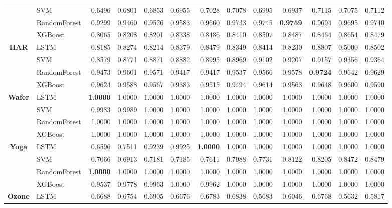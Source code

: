 \begin{table}[h]
\begin{adjustbox}{max width=15cm}
\begin{tabular}{|c|l|r|r|r|r|r|r|r|r|r|r|r|}
		& SVM &  0.6496 &  0.6801 &  0.6853 &  0.6955 &  0.7028 &  0.7078 &  0.6995 &  0.6937 &  0.7115 &  0.7075 &  0.7112 \\
		& RandomForest &  0.9299 &  0.9460 &  0.9526 &  0.9583 &  0.9660 &  0.9733 &  0.9745 &  \textbf{0.9759} &  0.9694 &  0.9695 &  0.9740 \\
		& XGBoost &  0.8065 &  0.8208 &  0.8201 &  0.8338 &  0.8486 &  0.8410 &  0.8507 &  0.8487 &  0.8464 &  0.8654 &  0.8479 \\
		\hline
		\textbf{HAR} & LSTM &  0.8185 &  0.8274 &  0.8214 &  0.8379 &  0.8479 &  0.8349 &  0.8414 &  0.8230 &  0.8807 &  0.5000 &  0.8502 \\
		& SVM &  0.8579 &  0.8771 &  0.8871 &  0.8882 &  0.8995 &  0.8969 &  0.9102 &  0.9207 &  0.9157 &  0.9356 &  0.9364 \\
		& RandomForest &  0.9473 &  0.9601 &  0.9571 &  0.9417 &  0.9417 &  0.9537 &  0.9566 &  0.9578 &  \textbf{0.9724} &  0.9642 &  0.9629 \\
		& XGBoost &  0.9624 &  0.9588 &  0.9567 &  0.9383 &  0.9515 &  0.9494 &  0.9614 &  0.9563 &  0.9648 &  0.9600 &  0.9590 \\
		\hline
		\textbf{Wafer} & LSTM &  \textbf{1.0000} &  1.0000 &  1.0000 &  1.0000 &  1.0000 &  1.0000 &  1.0000 &  1.0000 &  1.0000 &  1.0000 &  1.0000 \\
		& SVM &  0.9983 &  0.9989 &  1.0000 &  1.0000 &  1.0000 &  1.0000 &  1.0000 &  1.0000 &  1.0000 &  1.0000 &  1.0000 \\
		& RandomForest &  1.0000 &  1.0000 &  1.0000 &  1.0000 &  1.0000 &  1.0000 &  1.0000 &  1.0000 &  1.0000 &  1.0000 &  1.0000 \\
		& XGBoost &  1.0000 &  1.0000 &  1.0000 &  1.0000 &  1.0000 &  1.0000 &  1.0000 &  1.0000 &  1.0000 &  1.0000 &  1.0000 \\
		\hline
		\textbf{Yoga} & LSTM &  0.6596 &  0.7511 &  0.9239 &  0.9925 &  \textbf{1.0000} &  1.0000 &  1.0000 &  1.0000 &  1.0000 &  1.0000 &  1.0000 \\
		& SVM &  0.7066 &  0.6913 &  0.7181 &  0.7185 &  0.7611 &  0.7988 &  0.7731 &  0.8122 &  0.8205 &  0.8472 &  0.8479 \\
		& RandomForest &  \textbf{1.0000} &  1.0000 &  1.0000 &  1.0000 &  1.0000 &  1.0000 &  1.0000 &  1.0000 &  1.0000 &  1.0000 &  1.0000 \\
		& XGBoost &  0.9537 &  0.9778 &  0.9963 &  1.0000 &  0.9962 &  1.0000 &  1.0000 &  1.0000 &  1.0000 &  1.0000 &  1.0000 \\
		\hline
		\textbf{Ozone} & LSTM &  0.6688 &  0.6754 &  0.6905 &  0.6676 &  0.6783 &  0.6838 &  0.5683 &  0.6046 &  0.6768 &  0.5632 &  0.5817 \\

\end{tabular}
\end{adjustbox}
\end{table}
